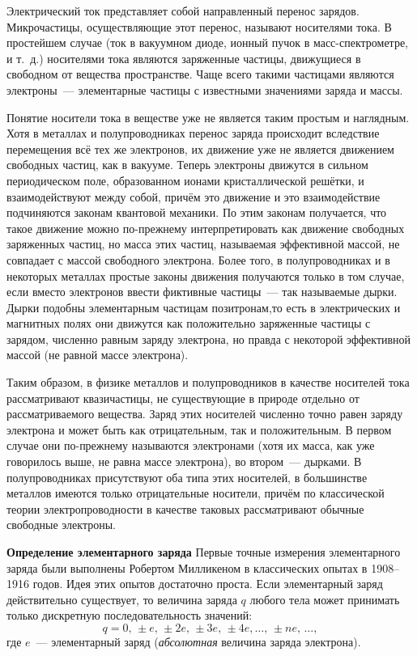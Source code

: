 
Электрический ток представляет собой направленный перенос зарядов. Микрочастицы, осуществляющие этот перенос, называют {\textsf{носителями тока}}. В простейшем случае (ток в вакуумном диоде, ионный пучок в масс-спектрометре, и т.~д.) носителями тока являются заряженные частицы, движущиеся в свободном от вещества пространстве. Чаще всего такими частицами являются электроны~--- элементарные частицы с известными значениями заряда и массы.

Понятие \textsf{носители тока в веществе} уже не является таким простым и наглядным. Хотя в металлах и полупроводниках перенос заряда происходит вследствие перемещения всё тех же электронов, их движение уже не является движением свободных частиц, как в вакууме. Теперь электроны движутся в сильном периодическом поле, образованном ионами кристаллической решётки, и взаимодействуют между собой, причём это движение и это взаимодействие подчиняются законам квантовой механики. По этим законам получается, что такое движение можно по-прежнему интерпретировать как движение свободных заряженных частиц, но масса этих частиц, называемая эффективной массой, не совпадает с массой свободного электрона. Более того, в полупроводниках и в некоторых металлах простые законы движения получаются только в том случае, если вместо электронов ввести фиктивные частицы~--- так называемые \textsf{дырки}. Дырки подобны элементарным частицам позитронам,то есть в электрических и магнитных полях они движутся как положительно заряженные частицы с зарядом, численно равным заряду электрона, но правда с некоторой эффективной массой (не равной массе электрона).



Таким образом, в физике металлов и полупроводников в качестве носителей тока рассматривают квазичастицы, не существующие в природе отдельно от рассматриваемого вещества. Заряд этих носителей численно точно равен заряду электрона и может быть как отрицательным, так и положительным. В первом случае они по-прежнему называются электронами (хотя их масса, как уже говорилось выше, не равна массе электрона), во втором~--- дырками. В полупроводниках присутствуют оба типа этих носителей, в большинстве металлов имеются только отрицательные носители, причём по классической теории электропроводности в качестве таковых рассматривают обычные свободные электроны.

{\bf \Large Определение элементарного заряда}
Первые точные измерения элементарного заряда были выполнены Робертом Милликеном в классических опытах в 1908--1916 годов. Идея этих опытов достаточно проста. Если элементарный заряд действительно существует, то величина заряда $q$ любого тела может принимать только дискретную последовательность значений:
$$
q = 0,\,\pm e,\,\pm2e,\,\pm3e,\,\pm4e, \ldots,\, \pm ne,\, \ldots,
$$
где $e$~--- элементарный заряд (\emph{абсолютная} величина заряда электрона).


